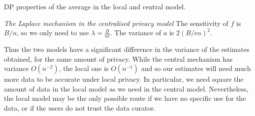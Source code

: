 \begin{frame}
\begin{exampleblock}{DP properties of the average in the local and central model.}
{      \emph{The Laplace mechanism in the centralised privacy model}
        The sensitivity of $f$ is $B / n$, so we only need to use $\lambda = \frac{B}{n \epsilon}$. The variance of $a$ is $2(B / \epsilon n)^2$. 

      Thus the two models have a significant difference in the variance of the estimates obtained, for the same amount of privacy. While the central mechanism has variance $O(n^{-2})$, the local one is $O(n^{-1})$ and so our estimates will need much more data to be accurate under local privacy. In particular, we need square the amount of data in the local model as we need in the central model. Nevertheless, the local model may be the only possible route if we have no specific use for the data, or if the users do not trust the data curator.
    }
    
  \end{exampleblock}
\end{frame}

